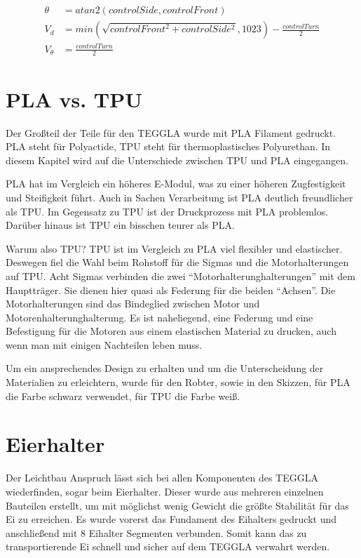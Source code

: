 \begin{align}
	\theta &= atan2(controlSide, controlFront)\\
	V_d &= min(\sqrt{controlFront^2 + controlSide^2}, 1023) - \frac{controlTurn}{2}\\
	V_\theta &= \frac{controlTurn}{2}
\end{align}


\section{PLA vs. TPU}
Der Großteil der Teile für den TEGGLA wurde mit PLA Filament gedruckt. 
PLA steht für Polyactide, TPU steht für thermoplastisches Polyurethan. 
In diesem Kapitel wird auf die Unterschiede zwischen TPU und PLA eingegangen. 

PLA hat im Vergleich ein höheres E-Modul, was zu einer höheren Zugfestigkeit und Steifigkeit führt. 
Auch in Sachen Verarbeitung ist PLA deutlich freundlicher als TPU. 
Im Gegensatz zu TPU ist der Druckprozess mit PLA problemlos. 
Darüber hinaus ist TPU ein bisschen teurer als PLA. 

Warum also TPU? TPU ist im Vergleich zu PLA viel flexibler und elastischer. 
Deswegen fiel die Wahl beim Rohstoff für die Sigmas und die Motorhalterungen auf TPU. 
Acht Sigmas verbinden die zwei ``Motorhalterunghalterungen'' mit dem Hauptträger. 
Sie dienen hier quasi als Federung für die beiden ``Achsen''. 
Die Motorhalterungen sind das Bindeglied zwischen Motor und Motorenhalterunghalterung. 
Es ist naheliegend, eine Federung und eine Befestigung für die Motoren aus einem elastischen Material zu drucken, auch wenn man mit einigen Nachteilen leben muss.

Um ein ansprechendes Design zu erhalten und um die Unterscheidung der Materialien zu erleichtern, wurde für den Robter, sowie in den Skizzen, für PLA die Farbe schwarz verwendet, für TPU die Farbe weiß.


\section{Eierhalter}					
Der Leichtbau Anspruch lässt sich bei allen Komponenten des TEGGLA wiederfinden, sogar beim Eierhalter. 
Dieser wurde aus mehreren einzelnen Bauteilen erstellt, um mit möglichst wenig Gewicht die größte Stabilität für das Ei zu erreichen. 
Es wurde vorerst das Fundament des Eihalters gedruckt und anschließend mit 8 Eihalter Segmenten verbunden. 
Somit kann das zu transportierende Ei schnell und sicher auf dem TEGGLA verwahrt werden. 

